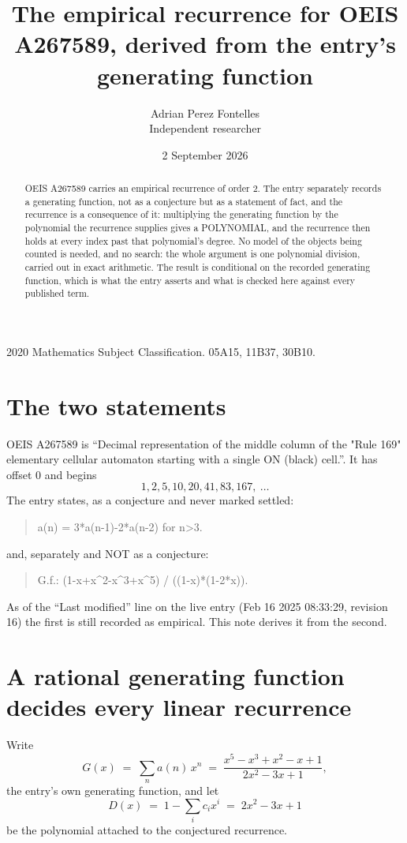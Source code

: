 \documentclass[11pt,a4paper]{article}
\title{The empirical recurrence for OEIS A267589, derived from the entry's generating function}
\author{Adrian Perez Fontelles\\ \small Independent researcher}
\date{2 September 2026}
\theoremstyle{plain}
\theoremstyle{definition}
\begin{document}
\maketitle

\begin{abstract}
OEIS A267589 carries an empirical recurrence of order $2$. The entry separately records a
generating function, not as a conjecture but as a statement of fact, and the recurrence is a
consequence of it: multiplying the generating function by the polynomial the recurrence
supplies gives a POLYNOMIAL, and the recurrence then holds at every index past that
polynomial's degree. No model of the objects being counted is needed, and no search: the
whole argument is one polynomial division, carried out in exact arithmetic. The result is
conditional on the recorded generating function, which is what the entry asserts and what is
checked here against every published term.
\end{abstract}

\noindent\small 2020 Mathematics Subject Classification. 05A15, 11B37, 30B10.\normalsize

\section{The two statements}

OEIS A267589 is ``Decimal representation of the middle column of the "Rule 169" elementary cellular automaton starting with a single ON (black) cell.''. It has offset $0$ and begins
\[
1, 2, 5, 10, 20, 41, 83, 167,\ \dots
\]
The entry states, as a conjecture and never marked settled:
\begin{quote}
a(n) = 3*a(n-1)-2*a(n-2) for n>3.
\end{quote}
and, separately and NOT as a conjecture:
\begin{quote}
G.f.: (1-x+x\^{}2-x\^{}3+x\^{}5) / ((1-x)*(1-2*x)).
\end{quote}
As of the ``Last modified'' line on the live entry (Feb 16 2025 08:33:29, revision 16) the first is still
recorded as empirical. This note derives it from the second.

\section{A rational generating function decides every linear recurrence}

Write
\[
G(x)\;=\;\sum_{n}a(n)\,x^{n}\;=\;\frac{x^{5} - x^{3} + x^{2} - x + 1}{2 x^{2} - 3 x + 1},
\]
the entry's own generating function, and let
\[
D(x)\;=\;1-\sum_i c_i x^{i}\;=\;2 x^{2} - 3 x + 1
\]
be the polynomial attached to the conjectured recurrence.
\end{document}
